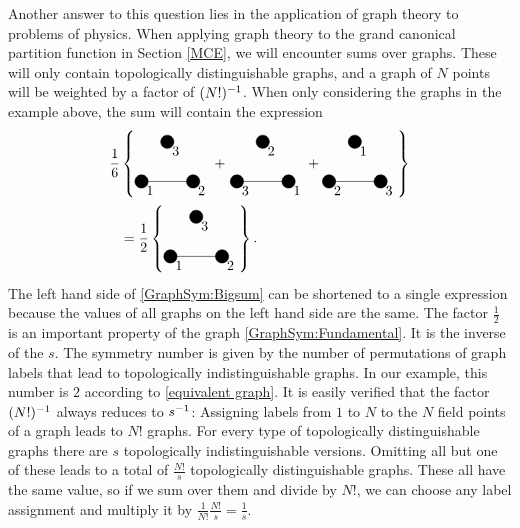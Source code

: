 \documentclass[8.5pt,twoside,twocolumn]{article}
\theoremstyle{standard}
\begin{document}
Another answer to this question lies in the application of graph theory to
problems of physics. When applying graph theory to the grand canonical partition function in Section \ref{MCE},
we will encounter sums over graphs. These will only contain topologically distinguishable
graphs, and a graph of $N$ points will be weighted by a factor of $(N!)^{-1}$. When only considering
the graphs in the example above, the sum will contain the expression
\begin{equation}
\begin{aligned}
\frac 1 {6} 
&\lt\{
\begin{tikzpicture}[baseline={(current bounding box.center)}]
  \exgraph{1}{2}{3}
\end{tikzpicture}
\rt.+\lt.
\begin{tikzpicture}[baseline={(current bounding box.center)}]
  \exgraph{3}{1}{2}
\end{tikzpicture}
+
\begin{tikzpicture}[baseline={(current bounding box.center)}]
  \exgraph{2}{3}{1}
\end{tikzpicture}
\rt\}\\
&=\frac 1 2 \lt\{
\begin{tikzpicture}[baseline={(current bounding box.center)}]
  \draw(0,0) node[circle,minimum size=.2cm,draw,fill=black] (A) {};
  \draw(1.3,0) node[circle,minimum size=.2cm,draw,fill=black] (B) {};
  \draw(.65,1) node[circle,minimum size=.2cm,draw,fill=black] (C) {};
  \draw (A.center) -- (B.center);
  \node [below right] at (A) {1};
  \node [below right] at (B) {2};
  \node [below right] at (C) {3};
\end{tikzpicture}\rt\}.
\end{aligned}
\label{GraphSym:Bigsum}
\end{equation}
The left hand side of \eqref{GraphSym:Bigsum} can be shortened to a single
expression because the values of all graphs on the left hand side are the same. The factor
$\frac 1 2$ is an important property of the graph \eqref{GraphSym:Fundamental}. It is the
inverse of the  $s$. The symmetry number is given by the number
of permutations of graph labels that lead to topologically indistinguishable graphs.
In our example, this number is $2$ according to \eqref{equivalent graph}. It is easily verified that
the factor $(N!)^{-1}$ always reduces to $s^{-1}$: Assigning labels from $1$ to $N$ to the $N$ field points
of a graph leads to $N!$ graphs. For every type of topologically distinguishable
graphs there are $s$ topologically indistinguishable versions. Omitting all
but one of these leads to a total of $\frac {N!} s$ topologically
distinguishable graphs.
These all have the same value, so if we sum over them and divide by $N!$, we
can choose any label assignment and multiply it by
$\frac 1 {N!} \frac {N!} s = \frac 1 s$.
\end{document}
